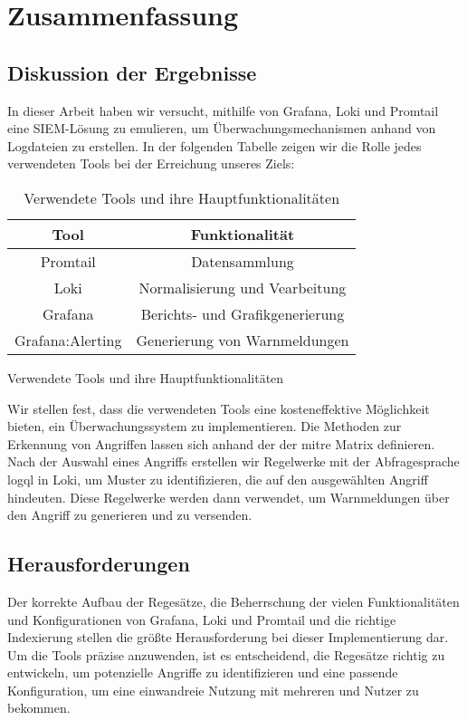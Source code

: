 \section{Zusammenfassung}

\subsection{Diskussion der Ergebnisse}
In dieser Arbeit haben wir versucht, mithilfe von Grafana, Loki und Promtail eine \gls{SIEM}-Lösung zu emulieren, um Überwachungsmechanismen anhand von Logdateien zu erstellen. In der folgenden Tabelle zeigen wir die Rolle jedes verwendeten Tools bei der Erreichung unseres Ziels:

\begin{table}[h]
    \centering
    \begin{tabular}{|c|c|}
    \hline
    \textbf{Tool}    & \textbf{Funktionalität}         \\ \hline
    Promtail         & Datensammlung                   \\ \hline
    Loki             & Normalisierung und Vearbeitung  \\ \hline
    Grafana          & Berichts- und Grafikgenerierung \\ \hline
    Grafana:Alerting & Generierung von Warnmeldungen   \\ \hline
    \end{tabular}
    \caption{Verwendete Tools und ihre Hauptfunktionalitäten} 
    {Verwendete Tools und ihre Hauptfunktionalitäten}
    \label{tab:VerewendeteTools}
\end{table}

Wir stellen fest, dass die verwendeten Tools eine kosteneffektive Möglichkeit bieten, ein Überwachungssystem zu implementieren. Die Methoden zur Erkennung von Angriffen lassen sich anhand der  der \gls{mitre} Matrix definieren. Nach der Auswahl eines Angriffs erstellen wir Regelwerke mit der Abfragesprache \gls{logql} in Loki, um Muster zu identifizieren, die auf den ausgewählten Angriff hindeuten. Diese Regelwerke werden dann verwendet, um Warnmeldungen über den Angriff zu generieren und zu versenden.


\subsection{Herausforderungen}
Der korrekte Aufbau der Regesätze, die Beherrschung der vielen Funktionalitäten und Konfigurationen von Grafana, Loki und Promtail und die richtige Indexierung stellen die größte Herausforderung bei dieser Implementierung dar. Um die Tools präzise anzuwenden, ist es entscheidend, die Regesätze richtig zu entwickeln, um potenzielle Angriffe zu identifizieren und eine passende Konfiguration, um eine einwandreie Nutzung mit mehreren  und Nutzer zu bekommen. 

